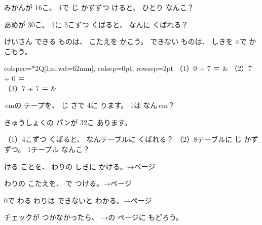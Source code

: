 \bkproblem みかんが 16こ。 4で じ かずずつ けると、 ひとり なんこ？
\bkshikiran
{}

\bkproblem あめが 30こ。 1に 5こずつ くばると、 なんに くばれる？
\bkshikiran
{}

\bkproblem けいさん できる ものは、 こたえを かこう。 できない ものは、 しきを ○で かこもう。\par\vspace{2pt}
\noindent\hspace*{1\zw}\begin{tblr}{colspec={*{2}{Q[l,m,wd=62mm]}}, colsep=0pt, rowsep=2pt}
（1）0 ÷ 7 ＝ \bkkakikomi & （2）7 ÷ 0 ＝ \bkkakikomi \\
（3）7 ÷ 7 ＝ \bkkakikomi & \\
\end{tblr}

\clearpage
{}

\,cmの テープを、 じ さで 4に ります。 1は なん\,cm？
\bkshikiran
{}

\bkproblem きゅうしょくの パンが 32こ あります。\par
（1）4こずつ くばると、 なんテーブルに くばれる？
\bkshikiran
（2）8テーブルに じ かずずつ。 1テーブル なんこ？
\bkshikiran
{}

\begin{furikaeri}\bkqmrag
\begin{checklist}
\item {}ける ことを、 わりの しきに かける。\hfill{\footnotesize\sffamily\color{bkTheme}→\pageref{bk:1-14:hitoribun}ページ}
\item わりの こたえを、 で つける。\hfill{\footnotesize\sffamily\color{bkTheme}→\pageref{bk:1-14:kuku}ページ}
\item 0で わる わりは できないと わかる。\hfill{\footnotesize\sffamily\color{bkTheme}→\pageref{bk:1-14:zero}ページ}
\end{checklist}
チェックが つかなかったら、 →の ページに もどろう。
\end{furikaeri}

\clearpage
